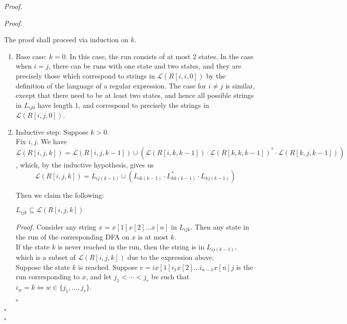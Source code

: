 \documentclass[a4paper]{article}
\newenvironment{proof}{\begin{breakbox}\textit{Proof.}}{\hfill$\square$\end{breakbox}}
\newcommand{\mc}{\mathcal}
\renewcommand{\L}{\mc{L}}
\begin{document}
\begin{proof}
    \begin{proof}

        The proof shall proceed via induction on $k$.

        \begin{enumerate}

            \item Base case: $k = 0$. In this case, the run consists of at most 2 states. In the case when $i = j$, there can be runs with one state and two states, and they are precisely those
                which correspond to strings in $\L(R[i, i, 0])$ by the definition of the language of a regular expression. The case for $i \ne j$ is similar, except that there need to be at
                least two states, and hence all possible strings in $L_{ij0}$ have length $1$, and correspond to precisely the strings in $\L(R[i, j, 0])$.

            \item Inductive step: Suppose $k > 0$.\\

                Fix $i, j$. We have $\L(R[i, j, k]) = \L(R[i, j, k - 1]) \cup (\L(R[i, k, k - 1]) \cdot \L(R[k, k, k - 1])^* \cdot \L(R[k, j, k - 1]))$, which, by the inductive hypothesis, gives us
                $$\L(R[i, j, k]) = L_{ij(k-1)} \cup (L_{ik(k-1)} \cdot L_{kk(k-1)}^* \cdot L_{kj(k-1)})$$

                Then we claim the following:\\

                \begin{claim}
                    $L_{ijk} \subseteq \L(R[i, j, k])$
                \end{claim}
                \begin{proof}
                    Consider any string $x = x[1] x[2] \ldots x[n]$ in $L_{ijk}$. Then any state in the run of the corresponding DFA on $x$ is at most $k$.\\

                    If the state $k$ is never reached in the run, then the string is in $L_{ij(k-1)}$, which is a subset of $\L(R[i, j, k])$ due to the expression above.\\

                    Suppose the state $k$ is reached. Suppose $e = i x[1] i_1 x[2] \ldots i_{n-1} x[n] j$ is the run corresponding to $x$, and let $j_1 < \cdots < j_r$ be such that $i_w = k \iff w
                        \in \{j_1, \ldots, j_r\}$.


\end{proof}
\end{enumerate}
\end{proof}
\end{proof}
\end{document}
